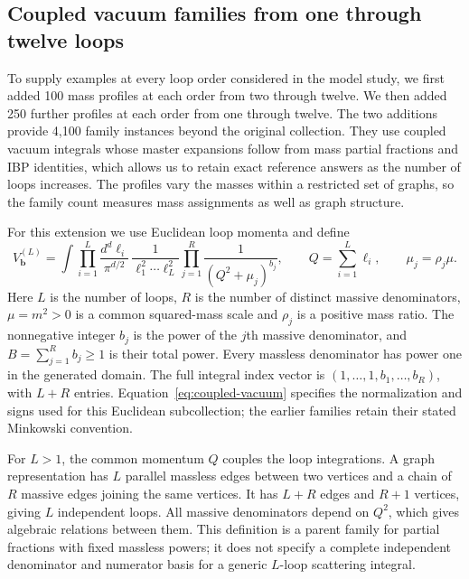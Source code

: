 \subsection{Coupled vacuum families from one through twelve loops}
\label{sec:higher-loop-generation}
To supply examples at every loop order considered in the model study,
we first added 100 mass profiles at each order from two through twelve.
We then added 250 further profiles at each order from one through twelve.
The two additions provide 4,100 family instances beyond the original collection. They use
coupled vacuum integrals whose master expansions follow from mass
partial fractions and IBP identities, which allows us to retain exact
reference answers as the number of loops increases. The profiles vary
the masses within a restricted set of graphs, so the family count
measures mass assignments as well as graph structure.

For this extension we use Euclidean loop momenta and define
\begin{equation}
 V^{(L)}_{\boldsymbol b}=
 \int\prod_{i=1}^{L}\frac{d^d\ell_i}{\pi^{d/2}}\,
 \frac{1}{\ell_1^2\cdots\ell_L^2}
 \prod_{j=1}^{R}\frac{1}{(Q^2+\mu_j)^{b_j}},
 \qquad
 Q=\sum_{i=1}^{L}\ell_i,\qquad \mu_j=\rho_j\mu .
 \label{eq:coupled-vacuum}
\end{equation}
Here $L$ is the number of loops, $R$ is the number of distinct massive
denominators, $\mu=m^2>0$ is a common squared-mass scale and
$\rho_j$ is a positive mass ratio. The nonnegative integer $b_j$
is the power of the $j$th massive denominator, and
$B=\sum_{j=1}^{R}b_j\geq1$ is their total power. Every massless
denominator has power one in the generated domain. The full integral
index vector is $(1,\ldots,1,b_1,\ldots,b_R)$, with $L+R$ entries.
Equation~\eqref{eq:coupled-vacuum} specifies the normalization and signs
used for this Euclidean subcollection; the earlier families retain
their stated Minkowski convention.

For $L>1$, the common momentum $Q$ couples the loop integrations. A graph
representation has $L$ parallel massless edges between two vertices
and a chain of $R$ massive edges joining the same vertices. It has
$L+R$ edges and $R+1$ vertices, giving $L$ independent loops.
All massive denominators depend on $Q^2$, which gives algebraic
relations between them. This definition is a parent family for partial
fractions with fixed massless powers; it does not specify a complete
independent denominator and numerator basis for a generic
$L$-loop scattering integral.

